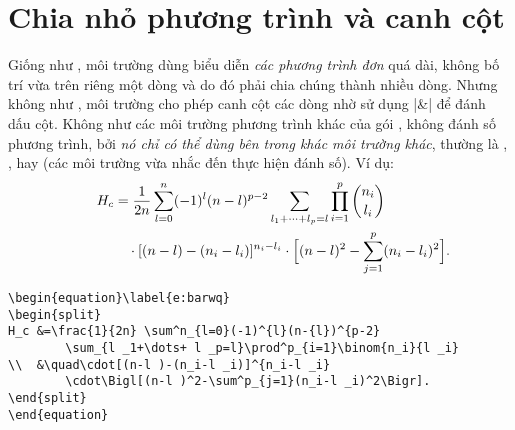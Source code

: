 \section{Chia nhỏ phương trình và canh cột}

Giống như , môi trường  dùng biểu diễn
\emph{các phương trình đơn} quá dài, không bố trí vừa trên riêng một dòng
và do đó phải chia chúng thành nhiều dòng.
Nhưng không như , môi trường 
cho phép canh cột các dòng nhờ sử dụng |&| để đánh dấu cột.
Không như các môi trường phương trình khác của gói ,
 không đánh số phương trình, bởi \emph{nó chỉ có thể dùng
bên trong khác môi trường khác}, thường là
, , hay 
(các môi trường vừa nhắc đến thực hiện đánh số). Ví dụ:
\begin{equation}\label{e:barwq}\begin{split}
H_c&=\frac{1}{2n} \sum^n_{l=0}(-1)^{l}(n-{l})^{p-2}
\sum_{l _1+\dots+ l _p=l}\prod^p_{i=1} \binom{n_i}{l _i}\\
&\quad\cdot[(n-l )-(n_i-l _i)]^{n_i-l _i}\cdot
\Bigl[(n-l )^2-\sum^p_{j=1}(n_i-l _i)^2\Bigr].
\kern-2em %
\end{split}\end{equation}

\begin{verbatim}
\begin{equation}\label{e:barwq}
\begin{split}
H_c &=\frac{1}{2n} \sum^n_{l=0}(-1)^{l}(n-{l})^{p-2}
	    \sum_{l _1+\dots+ l _p=l}\prod^p_{i=1}\binom{n_i}{l _i}
\\  &\quad\cdot[(n-l )-(n_i-l _i)]^{n_i-l _i}
        \cdot\Bigl[(n-l )^2-\sum^p_{j=1}(n_i-l _i)^2\Bigr].
\end{split}
\end{equation}
\end{verbatim}

